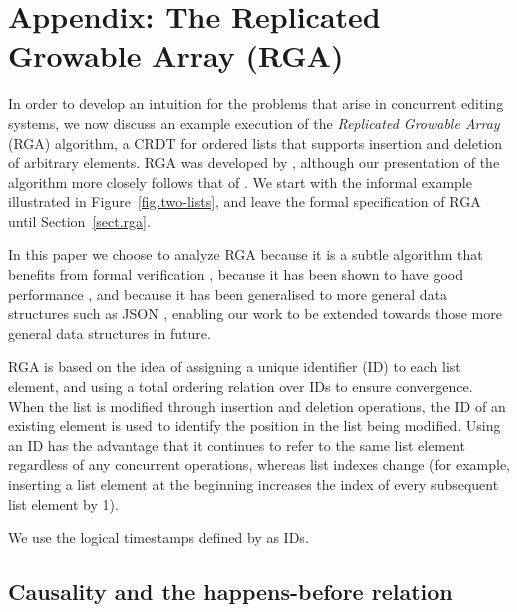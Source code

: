 \appendix
\section{Appendix: The Replicated Growable Array (RGA)}\label{sect.rga.background}

In order to develop an intuition for the problems that arise in concurrent editing systems, we now
discuss an example execution of the \emph{Replicated Growable Array} (RGA) algorithm, a CRDT for
ordered lists that supports insertion and deletion of arbitrary elements. RGA was developed by
\citet{Roh:2011dw}, although our presentation of the algorithm more closely follows that of
\citet{Shapiro:2011wy}. We start with the informal example illustrated in
Figure~\ref{fig.two-lists}, and leave the formal specification of RGA until Section~\ref{sect.rga}.

In this paper we
choose to analyze RGA because it is a subtle algorithm that benefits from formal verification
\cite{Attiya:2016kh}, because it has been shown to have good performance \cite{Mehdi:2011ke}, and
because it has been generalised to more general data structures such as JSON
\cite{Kleppmann:2016ve}, enabling our work to be extended towards those more general data structures
in future.

RGA is based on the idea of assigning a unique identifier (ID) to each list element, and using a
total ordering relation over IDs to ensure convergence. When the list is modified through insertion
and deletion operations, the ID of an existing element is used to identify the position in the list
being modified. Using an ID has the advantage that it continues to refer to the same list element
regardless of any concurrent operations, whereas list indexes change (for example, inserting a list
element at the beginning increases the index of every subsequent list element by 1).

We use the logical timestamps defined by \citet{Lamport:1978jq} as IDs.


\subsection{Causality and the happens-before relation}\label{sect.causality}

